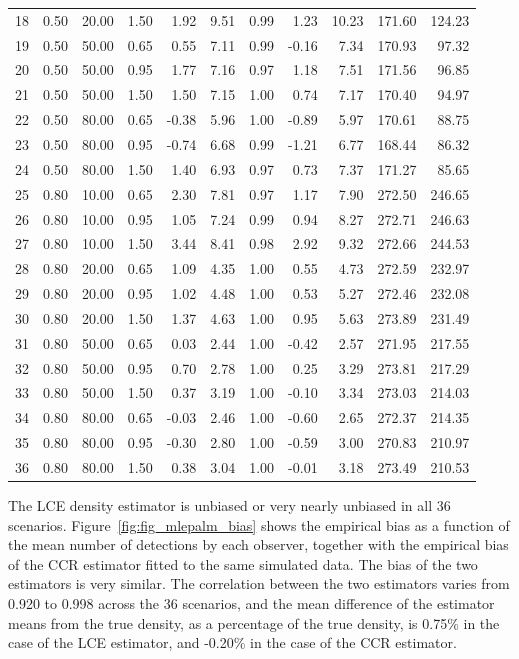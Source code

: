 \documentclass[useAMS, usenatbib, referee]{biom}\usepackage[]{graphicx}\usepackage[]{color}
\begin{document}
\begin{table}[ht]
{\begin{tabular}{rrrrrrrrrrr}
  18 & 0.50 & 20.00 & 1.50 & 1.92 & 9.51 & 0.99 & 1.23 & 10.23 & 171.60 & 124.23 \\ 
  19 & 0.50 & 50.00 & 0.65 & 0.55 & 7.11 & 0.99 & -0.16 & 7.34 & 170.93 & 97.32 \\ 
  20 & 0.50 & 50.00 & 0.95 & 1.77 & 7.16 & 0.97 & 1.18 & 7.51 & 171.56 & 96.85 \\ 
  21 & 0.50 & 50.00 & 1.50 & 1.50 & 7.15 & 1.00 & 0.74 & 7.17 & 170.40 & 94.97 \\ 
  22 & 0.50 & 80.00 & 0.65 & -0.38 & 5.96 & 1.00 & -0.89 & 5.97 & 170.61 & 88.75 \\ 
  23 & 0.50 & 80.00 & 0.95 & -0.74 & 6.68 & 0.99 & -1.21 & 6.77 & 168.44 & 86.32 \\ 
  24 & 0.50 & 80.00 & 1.50 & 1.40 & 6.93 & 0.97 & 0.73 & 7.37 & 171.27 & 85.65 \\ 
  25 & 0.80 & 10.00 & 0.65 & 2.30 & 7.81 & 0.97 & 1.17 & 7.90 & 272.50 & 246.65 \\ 
  26 & 0.80 & 10.00 & 0.95 & 1.05 & 7.24 & 0.99 & 0.94 & 8.27 & 272.71 & 246.63 \\ 
  27 & 0.80 & 10.00 & 1.50 & 3.44 & 8.41 & 0.98 & 2.92 & 9.32 & 272.66 & 244.53 \\ 
  28 & 0.80 & 20.00 & 0.65 & 1.09 & 4.35 & 1.00 & 0.55 & 4.73 & 272.59 & 232.97 \\ 
  29 & 0.80 & 20.00 & 0.95 & 1.02 & 4.48 & 1.00 & 0.53 & 5.27 & 272.46 & 232.08 \\ 
  30 & 0.80 & 20.00 & 1.50 & 1.37 & 4.63 & 1.00 & 0.95 & 5.63 & 273.89 & 231.49 \\ 
  31 & 0.80 & 50.00 & 0.65 & 0.03 & 2.44 & 1.00 & -0.42 & 2.57 & 271.95 & 217.55 \\ 
  32 & 0.80 & 50.00 & 0.95 & 0.70 & 2.78 & 1.00 & 0.25 & 3.29 & 273.81 & 217.29 \\ 
  33 & 0.80 & 50.00 & 1.50 & 0.37 & 3.19 & 1.00 & -0.10 & 3.34 & 273.03 & 214.03 \\ 
  34 & 0.80 & 80.00 & 0.65 & -0.03 & 2.46 & 1.00 & -0.60 & 2.65 & 272.37 & 214.35 \\ 
  35 & 0.80 & 80.00 & 0.95 & -0.30 & 2.80 & 1.00 & -0.59 & 3.00 & 270.83 & 210.97 \\ 
  36 & 0.80 & 80.00 & 1.50 & 0.38 & 3.04 & 1.00 & -0.01 & 3.18 & 273.49 & 210.53 \\ 
   \hline
\end{tabular}
}
\endgroup
\end{table}


The LCE density estimator is unbiased or very nearly unbiased  in all 36 scenarios. Figure~\ref{fig:fig_mlepalm_bias} shows the empirical bias as a function of the mean number of detections by each observer, together with the empirical bias of the CCR estimator fitted to the same simulated data. The bias of the two estimators is very similar. The correlation between the two estimators varies from 0.920 to 0.998 across the 36 scenarios, and the mean difference of the estimator means from the true density, as a percentage of the true density, is 0.75\% in the case of the LCE estimator, and -0.20\% in the case of the CCR estimator.
\end{document}
